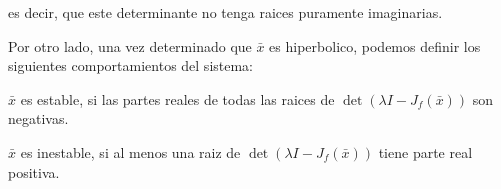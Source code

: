         es decir, que este determinante no tenga raices puramente imaginarias.

        Por otro lado, una vez determinado que $\bar{x}$ es hiperbolico, podemos definir los siguientes comportamientos del sistema:

        $\bar{x}$ es estable, si las partes reales de todas las raices de $\det{(\lambda I - J_f(\bar{x}))}$ son negativas.

        $\bar{x}$ es inestable, si al menos una raiz de $\det{(\lambda I - J_f(\bar{x}))}$ tiene parte real positiva.



